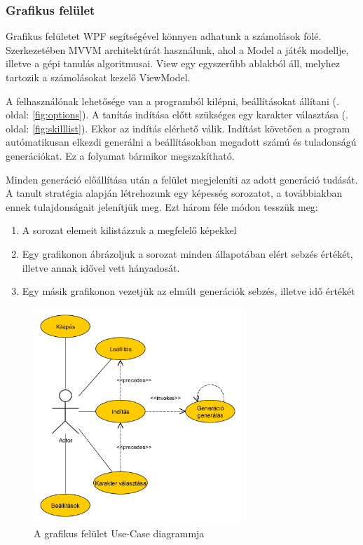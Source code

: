 \documentclass[12pt]{article}
\begin{document}
\subsubsection{Grafikus felület}

Grafikus felületet WPF segítségével könnyen adhatunk a számolások fölé. Szerkezetében MVVM architektúrát használunk, ahol a Model a játék modellje, illetve a gépi tanulás algoritmusai. View egy egyszerűbb ablakból áll, melyhez tartozik a számolásokat kezelő ViewModel. 

A felhasználónak lehetősége van a programból kilépni, beállításokat állítani (\pageref{fig:options}. oldal: \ref{fig:options}). A tanítás indítása előtt szükséges egy karakter választása (\pageref{fig:skilllist}. oldal: \ref{fig:skilllist}). Ekkor az indítás elérhető válik. Indítást követően a program autómatikusan elkezdi generálni a beállításokban megadott számú és tuladonságú generációkat. Ez a folyamat bármikor megszakítható.

Minden generáció előállítása után a felület megjeleníti az adott generáció tudását. A tanult stratégia alapján létrehozunk egy képesség sorozatot, a továbbiakban ennek tulajdonságait jelenítjük meg. Ezt három féle módon tesszük meg:

\begin{enumerate}
	\item A sorozat elemeit kilistázzuk a megfelelő képekkel
	\item Egy grafikonon ábrázoljuk a sorozat minden állapotában elért sebzés értékét, illetve annak idővel vett hányadosát.
	\item Egy másik grafikonon vezetjük az elmúlt generációk sebzés, illetve idő értékét
\end{enumerate}

\begin{figure}[H]
	\begin{center}
		\includegraphics[width=0.7\textwidth]{usecase}
	\end{center}
	\caption{A grafikus felület Use-Case diagrammja}
	\label{fig:usecase}
\end{figure}
\end{document}
